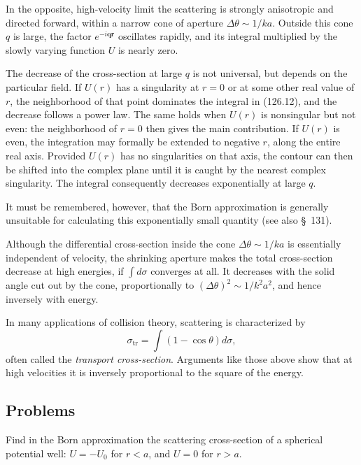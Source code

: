 In the opposite, high-velocity limit the scattering is strongly anisotropic
and directed forward, within a narrow cone of aperture
$\Delta\theta\sim1/ka$. Outside this cone $q$ is large, the factor
$e^{-i\mathbf{qr}}$ oscillates rapidly, and its integral multiplied by the
slowly varying function $U$ is nearly zero.

The decrease of the cross-section at large $q$ is not universal, but depends
on the particular field. If $U(r)$ has a singularity at $r=0$ or at some other
real value of $r$, the neighborhood of that point dominates the integral in
(126.12), and the decrease follows a power law. The same holds when $U(r)$ is
nonsingular but not even: the neighborhood of $r=0$ then gives the main
contribution. If $U(r)$ is even, the integration may formally be extended to
negative $r$, along the entire real axis. Provided $U(r)$ has no singularities
on that axis, the contour can then be shifted into the complex plane until it
is caught by the nearest complex singularity. The integral consequently
decreases exponentially at large $q$.

It must be remembered, however, that the Born approximation is generally
unsuitable for calculating this exponentially small quantity (see also
\S~131).

Although the differential cross-section inside the cone
$\Delta\theta\sim1/ka$ is essentially independent of velocity, the shrinking
aperture makes the total cross-section decrease at high energies, if
$\int d\sigma$ converges at all. It decreases with the solid angle cut out by
the cone, proportionally to $(\Delta\theta)^2\sim1/k^2a^2$, and hence
inversely with energy.

In many applications of collision theory, scattering is characterized by
\begin{equation}
 \sigma_{\mathrm{tr}}=\int(1-\cos\theta)d\sigma,
 \tag{126.15}
\end{equation}
often called the \emph{transport cross-section}. Arguments like those above
show that at high velocities it is inversely proportional to the square of the
energy.

\subsection*{Problems}

 Find in the Born approximation the scattering
cross-section of a spherical potential well: $U=-U_0$ for $r<a$, and $U=0$ for
$r>a$.

